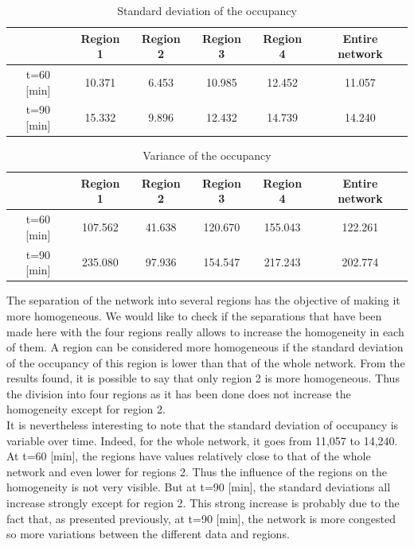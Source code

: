 \documentclass[a4paper, 12pt,oneside]{article}
\begin{document}
\begin{table}[H]
\begin{center}
\begin{tabular}{|c|c|c|c|c|c|}
\hline   & Region 1 & Region 2 & Region 3 & Region 4 & Entire network \\
\hline t=60 [min] & 10.371 & 6.453 & 10.985 & 12.452 & 11.057 \\
\hline  t=90 [min] & 15.332 & 9.896 & 12.432 & 14.739 & 14.240 \\
\hline
\end{tabular}
\caption{Standard deviation of the occupancy}
\label{Standard deviation of the occupancy}
\end{center}
\end{table}

\begin{table}[H]
\begin{center}
\begin{tabular}{|c|c|c|c|c|c|}
\hline   & Region 1 & Region 2 & Region 3 & Region 4 & Entire network \\
\hline t=60 [min] & 107.562 & 41.638 & 120.670 & 155.043 & 122.261 \\
\hline  t=90 [min] & 235.080 & 97.936 & 154.547& 217.243 & 202.774 \\
\hline
\end{tabular}
\caption{Variance of the occupancy}
\label{Variance of the occupancy}
\end{center}
\end{table}

The separation of the network into several regions has the objective of making it more homogeneous. We would like to check if the separations that have been made here with the four regions really allows to increase the homogeneity in each of them. A region can be considered more homogeneous if the standard deviation of the occupancy of this region is lower than that of the whole network. From the results found, it is possible to say that only region 2 is more homogeneous. Thus the division into four regions as it has been done does not increase the homogeneity except for region 2.\\
It is nevertheless interesting to note that the standard deviation of occupancy is variable over time. Indeed, for the whole network, it goes from 11,057 to 14,240. At t=60 [min], the regions have values relatively close to that of the whole network and even lower for regions 2. Thus the influence of the regions on the homogeneity is not very visible. But at t=90 [min], the standard deviations all increase strongly except for region 2. This strong increase is probably due to the fact that, as presented previously, at t=90 [min], the network is more congested so more variations between the different data and regions.
\end{document}
